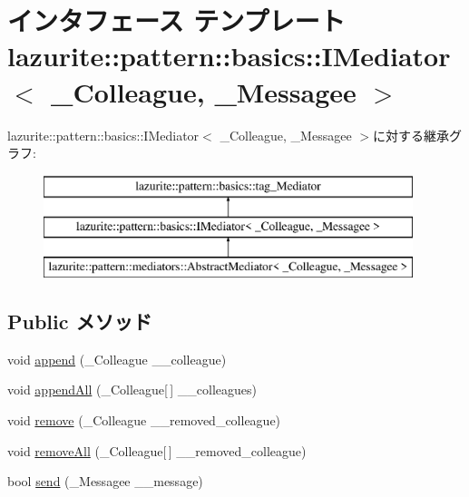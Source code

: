 \hypertarget{interfacelazurite_1_1pattern_1_1basics_1_1_i_mediator_3_01___colleague_00_01___messagee_01_4}{
\section{インタフェース テンプレート lazurite::pattern::basics::IMediator$<$ \_\-Colleague, \_\-Messagee $>$}
\label{interfacelazurite_1_1pattern_1_1basics_1_1_i_mediator_3_01___colleague_00_01___messagee_01_4}
}
lazurite::pattern::basics::IMediator$<$ \_\-Colleague, \_\-Messagee $>$に対する継承グラフ:\begin{figure}[H]
\begin{center}
\leavevmode
\includegraphics[height=3cm]{interfacelazurite_1_1pattern_1_1basics_1_1_i_mediator_3_01___colleague_00_01___messagee_01_4}
\end{center}
\end{figure}
\subsection*{Public メソッド}
\begin{DoxyCompactItemize}
\item 
void \hyperlink{interfacelazurite_1_1pattern_1_1basics_1_1_i_mediator_3_01___colleague_00_01___messagee_01_4_a9c7651e26bd9e0bb57093a92ef372e66}{append} (\_\-Colleague \_\-\_\-colleague)
\item 
void \hyperlink{interfacelazurite_1_1pattern_1_1basics_1_1_i_mediator_3_01___colleague_00_01___messagee_01_4_a60acf7d5d011dd442fc651b2bfb49081}{appendAll} (\_\-Colleague\mbox{[}$\,$\mbox{]} \_\-\_\-colleagues)
\item 
void \hyperlink{interfacelazurite_1_1pattern_1_1basics_1_1_i_mediator_3_01___colleague_00_01___messagee_01_4_a867d7d49b3bb27af92b9ae425a09f956}{remove} (\_\-Colleague \_\-\_\-removed\_\-colleague)
\item 
void \hyperlink{interfacelazurite_1_1pattern_1_1basics_1_1_i_mediator_3_01___colleague_00_01___messagee_01_4_ab594b14be1fa04f9445ad1737115cb80}{removeAll} (\_\-Colleague\mbox{[}$\,$\mbox{]} \_\-\_\-removed\_\-colleague)
\item 
bool \hyperlink{interfacelazurite_1_1pattern_1_1basics_1_1_i_mediator_3_01___colleague_00_01___messagee_01_4_a82cd22f9cc946dcaa4be2a2cf87674b3}{send} (\_\-Messagee \_\-\_\-message)
\end{DoxyCompactItemize}


